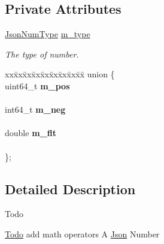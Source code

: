 \subsection*{Private Attributes}
\begin{DoxyCompactItemize}
\item 
\mbox{\label{classnta_1_1utils_1_1JsonNum_abd54e505bcd33dc45877c4b4bb92fa4e}} 
\hyperlink{namespacenta_1_1utils_a83ee7c4cfccd9fa43564f5fe1c0c77d3}{Json\+Num\+Type} \hyperlink{classnta_1_1utils_1_1JsonNum_abd54e505bcd33dc45877c4b4bb92fa4e}{m\+\_\+type}
\begin{DoxyCompactList}\small\item\em The type of number. \end{DoxyCompactList}\item 
\mbox{\label{classnta_1_1utils_1_1JsonNum_a8f60aff135bd41d1680ecdaa738a4a02}} 
\begin{tabbing}
xx\=xx\=xx\=xx\=xx\=xx\=xx\=xx\=xx\=\kill
union \{\\
\mbox{\label{classnta_1_1utils_1_1JsonNum_a266052a158fca895978bb7d9ec43f6ff}} 
uint64\_t {\bfseries m\_pos}\\
\>\\
\mbox{\label{classnta_1_1utils_1_1JsonNum_af488d5d931bc8979df8671070365ac2b}} 
int64\_t {\bfseries m\_neg}\\
\>\\
\mbox{\label{classnta_1_1utils_1_1JsonNum_a01cf51bb14293115a5b3f140ade23d4d}} 
double {\bfseries m\_flt}\\
\>\\
\}; \\

\end{tabbing}\end{DoxyCompactItemize}


\subsection{Detailed Description}
\begin{DoxyRefDesc}{Todo}
\item[\hyperlink{todo__todo000005}{Todo}]add math operators A \hyperlink{classnta_1_1utils_1_1Json}{Json} Number \end{DoxyRefDesc}


